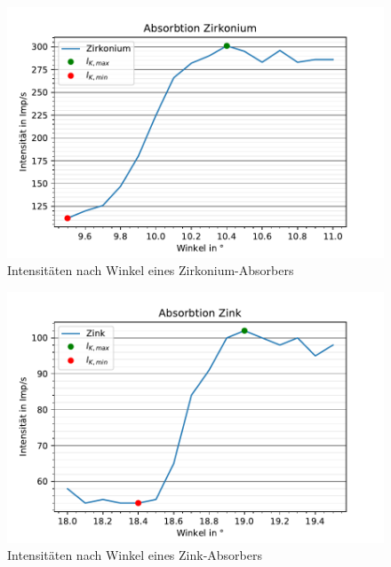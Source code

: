   \begin{figure}
    \centering
    \includegraphics{AbsorbtionsspektrumZirkonium.pdf}
    \caption{Intensitäten nach Winkel eines Zirkonium-Absorbers}
    \label{fig:EmspektrumIV}
  \end{figure}

  \begin{figure}
    \centering
    \includegraphics{AbsorbtionsspektrumZink.pdf}
    \caption{Intensitäten nach Winkel eines Zink-Absorbers}
    \label{fig:EmspektrumV}
  \end{figure}

